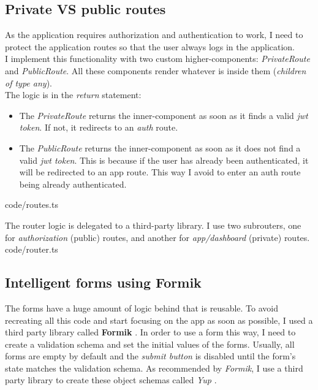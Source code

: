     \subsection{Private VS public routes}
        As the application requires authorization and authentication to work, I need to protect the application routes so that the user always logs in the application. \\

        I implement this functionality with two custom higher-components: \textit{PrivateRoute} and \textit{PublicRoute}. All these components render whatever is inside them (\textit{children of type any}). \\
        The logic is in the \textit{return} statement:
        \begin{itemize}[noitemsep]
            \item The \textit{PrivateRoute} returns the inner-component as soon as it finds a valid \textit{jwt token}. If not, it redirects to an \textit{auth} route.
            \item The \textit{PublicRoute} returns the inner-component as soon as it does not find a valid \textit{jwt token}. This is because if the user has already been authenticated, it will be redirected to an app route. This way I avoid to enter an auth route being already authenticated.
        \end{itemize}
        
        {code/routes.ts}

        The router logic is delegated to a third-party library. I use two subrouters, one for \textit{authorization} (public) routes, and another for \textit{app/dashboard} (private) routes. \\
        
        {code/router.ts}

    \subsection{Intelligent forms using Formik}
        The forms have a huge amount of logic behind that is reusable. To avoid recreating all this code and start focusing on the app as soon as possible, I used a third party library called \textbf{Formik} \cite{Formik}.
        In order to use a form this way, I need to create a validation schema and set the initial values of the forms. Usually, all forms are empty by default and the \textit{submit button} is disabled until the
        form's state matches the validation schema.
        As recommended by \textit{Formik}, I use a third party library to create these object schemas called \textit{Yup} \cite{Yup}.

